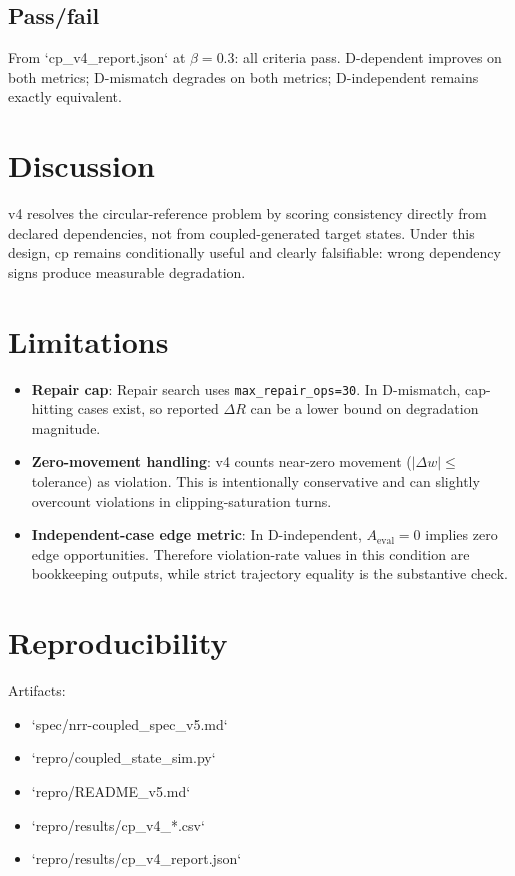 \documentclass[11pt,a4paper]{article}
\begin{document}
\subsection{Pass/fail}
From `cp\_v4\_report.json` at \(\beta=0.3\): all criteria pass.
D-dependent improves on both metrics; D-mismatch degrades on both metrics; D-independent remains exactly equivalent.

\section{Discussion}
v4 resolves the circular-reference problem by scoring consistency directly from declared dependencies, not from coupled-generated target states. Under this design, cp remains conditionally useful and clearly falsifiable: wrong dependency signs produce measurable degradation.

\section{Limitations}
\begin{itemize}
  \item \textbf{Repair cap}: Repair search uses \texttt{max\_repair\_ops=30}. In D-mismatch, cap-hitting cases exist, so reported \(\Delta R\) can be a lower bound on degradation magnitude.
  \item \textbf{Zero-movement handling}: v4 counts near-zero movement (\(|\Delta w|\le\) tolerance) as violation. This is intentionally conservative and can slightly overcount violations in clipping-saturation turns.
  \item \textbf{Independent-case edge metric}: In D-independent, \(A_{\text{eval}}=0\) implies zero edge opportunities. Therefore violation-rate values in this condition are bookkeeping outputs, while strict trajectory equality is the substantive check.
\end{itemize}

\section{Reproducibility}
Artifacts:
\begin{itemize}
  \item `spec/nrr-coupled\_spec\_v5.md`
  \item `repro/coupled\_state\_sim.py`
  \item `repro/README\_v5.md`
  \item `repro/results/cp\_v4\_*.csv`
  \item `repro/results/cp\_v4\_report.json`
\end{itemize}
\end{document}
